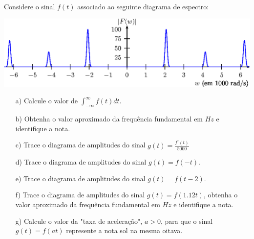 \begin{exer} Considere o sinal $f(t)$ associado ao seguinte diagrama de espectro:
\begin{center}
\includegraphics{cap_propriedades_transformada/pics/figura_21}\end{center}
\begin{itemize}
\item[a)] Calcule o valor de $\int_{-\infty}^\infty f(t) dt$.
\item[b)] Obtenha o valor aproximado da frequência fundamental em $Hz$ e identifique a nota.
\item[c)] Trace o diagrama de amplitudes do sinal $g(t)=\frac{f'(t)}{5000}$
\item[d)] Trace o diagrama de amplitudes do sinal $g(t)=f(-t)$.
\item[e)] Trace o diagrama de amplitudes do sinal $g(t)=f(t-2)$.
\item[f)] Trace o diagrama de amplitudes do sinal $g(t)=f(1.12t)$, obtenha o valor aproximado da frequência fundamental em $Hz$ e identifique a nota.
\item[g)] Calcule o valor da "taxa de aceleração", $a>0$, para que o sinal $g(t)=f(at)$ represente a nota sol na mesma oitava.
\end{itemize}
\end{exer}
